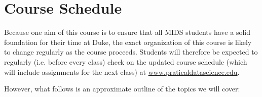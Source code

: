\documentclass[12pt]{article}
\begin{document}
\section{Course Schedule}

Because one aim of this course is to ensure that all MIDS students have a solid foundation for their time at Duke, the exact organization of this course is likely to change regularly as the course proceeds. Students will therefore be expected to regularly (i.e. before every class) check on the updated course schedule (which will include assignments for the next class) at \url{www.praticaldatascience.edu}.

However, what follows is an approximate outline of the topics we will cover:

\end{document}
